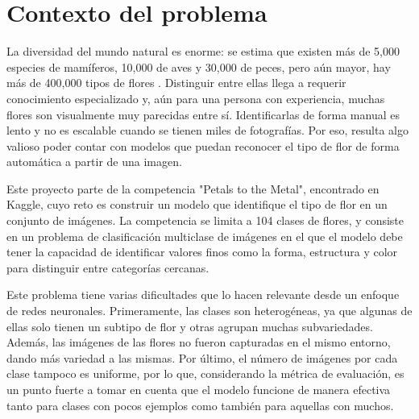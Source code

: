\section{Contexto del problema}
La diversidad del mundo natural es enorme: se estima que existen más de 5,000 especies de mamíferos, 10,000 de aves y 30,000 de peces, pero aún mayor, hay más de 400,000 tipos de flores \autocite{kagglePetalsMetal}. Distinguir entre ellas llega a requerir conocimiento especializado y, aún para una persona con experiencia, muchas flores son visualmente muy parecidas entre sí. Identificarlas de forma manual es lento y no es escalable cuando se tienen miles de fotografías. Por eso, resulta algo valioso poder contar con modelos que puedan reconocer el tipo de flor de forma automática a partir de una imagen. 

Este proyecto parte de la competencia "Petals to the Metal", encontrado en Kaggle, cuyo reto es construir un modelo que identifique el tipo de flor en un conjunto de imágenes. La competencia se limita a 104 clases de flores, y consiste en un problema de clasificación multiclase de imágenes en el que el modelo debe tener la capacidad de identificar valores finos como la forma, estructura y color para distinguir entre categorías cercanas. 

Este problema tiene varias dificultades que lo hacen relevante desde un enfoque de redes neuronales. Primeramente, las clases son heterogéneas, ya que algunas de ellas solo tienen un subtipo de flor y otras agrupan muchas subvariedades. Además, las imágenes de las flores no fueron capturadas en el mismo entorno, dando más variedad a las mismas. Por último, el número de imágenes por cada clase tampoco es uniforme, por lo que, considerando la métrica de evaluación, es un punto fuerte a tomar en cuenta que el modelo funcione de manera efectiva tanto para clases con pocos ejemplos como también para aquellas con muchos. 

